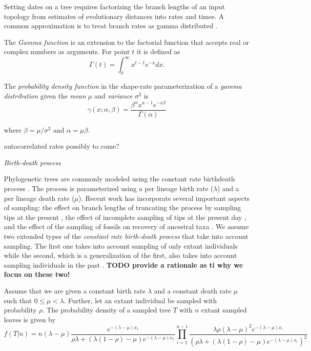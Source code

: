\documentclass{llncs}
\newcommand{\ejmcomment}[1]{{\color{green} #1}}
\renewcommand{\subsection}[1]{%
\bigskip
\begin{center}
\begin{large}
\normalfont\itshape #1
\end{large}
\end{center}}
\begin{document}
Setting dates on a tree requires factorizing the branch lengths of an input topology
from estimates of evolutionary distances into rates and times. 
A common approximation is to treat branch rates as gamma distributed \citep{Kishino2001}.


The {\em Gamma function} is an extension to the factorial function that accepts
real or complex numbers as arguments. For point $t$ it is defined as
$$\Gamma(t) = \int_0^\infty x^{t-1} e^{-x} dx.$$

The {\em probability density function} in the shape-rate parameterization of a
{\em gamma distribution} given the {\em mean} $\mu$ and {\em variance} $\sigma^2$ 
is
$$ \gamma(x;\alpha,\beta) = \frac{\beta^{\alpha}x^{a-1}e^{-x\beta}}{\Gamma(\alpha)} $$

where $\beta = \mu / \sigma^2$ and $\alpha = \mu \beta$.

\ejmcomment{autocorrelated rates possibly to come?}

\subsection{Birth-death process}
Phylogenetic trees are commonly modeled using the constant rate birth\textendash death process \citep{Kendall1948}.
The process is parameterized using a per lineage birth rate ($\lambda$) and a per lineage death rate ($\mu$).
Recent work has incorporate several important aspects of sampling:
the effect on branch lengths of truncating the process by sampling tips at the present \citep{Gernhard2008},
the effect of incomplete sampling of tips at the present day \citep{Stadler2009}, and the effect of the sampling
of fossils on recovery of ancestral taxa \citep{Stadler2010}.
We assume two extended types of the {\em constant rate birth-death process}
that take into account sampling. The
first one takes into account sampling of only extant individuals
\citep{Stadler2009} while the second, which is a generalization of the first,
also takes into account sampling individuals in the past \citep{Stadler2010}.
{\bf TODO provide a rationale as ti why we focus on these two!} 

Assume that we are given a constant birth rate $\lambda$ and a constant death rate $\mu$ such that
$0 \leq \mu < \lambda$. Further, let an extant individual be sampled with
probability $\rho$.  The probability density of a sampled tree $T$ with $n$
extant sampled leaves is given by
%
%
$$f(T|n) = n(\lambda-\mu)\frac{e^{-(\lambda-\mu)x_1}}{\rho\lambda + (\lambda(1 -\rho)-\mu)e^{-(\lambda-\mu)x_1}}\prod_{i=1}^{n-1}
\frac{\lambda\rho(\lambda-\mu)^2e^{-(\lambda-\mu)x_i}}{(\rho\lambda + (\lambda(1-\rho)-\mu)e^{-(\lambda-\mu)x_i})^2}$$
%
%
\end{document}
